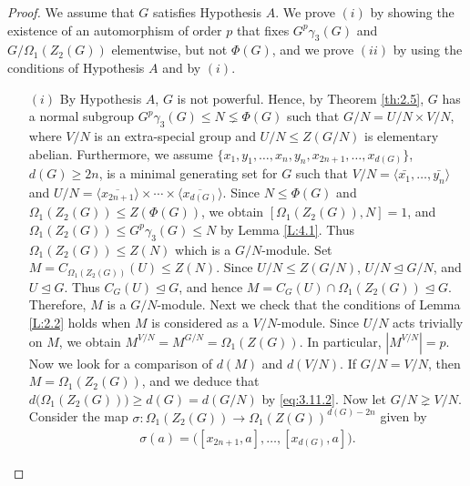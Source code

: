 \documentclass[preprint,sort&compress,12pt]{elsarticle}
\theoremstyle{definition}
\numberwithin{equation}{theorem}
\begin{document}
\begin{proof}
We assume that $G$ satisfies Hypothesis $A$. We prove $(i)$ by showing the existence of an automorphism of order $p$ that fixes $G^p\gamma_3(G)$ and $G/\Omega_1(Z_2(G))$ elementwise, but not $\Phi(G)$, and we prove $(ii)$ by using the conditions of Hypothesis $A$ and by $(i)$. 
\begin{itemize}
\item [$(i)$] By Hypothesis $A$, $G$ is not powerful. Hence, by Theorem \ref{th:2.5}, $G$ has a normal subgroup $G^p\gamma_3(G)\le N\lneq \Phi(G)$ such that $G/N=U/N\times V/N$, where $V/N$ is an extra-special group and $U/N\le Z(G/N)$ is elementary abelian. Furthermore, we assume $\{x_1, y_1, \dots, x_n, y_n, x_{2n+1}, \dots, x_{d(G)}\}$, $d(G)\ge 2n$, is a minimal generating set for $G$ such that $V/N=\langle \bar{x_1}, \dots, \bar{y_n}\rangle$ and $U/N=\langle \overline{x_{2n+1}}\rangle \times \cdots \times \langle \overline{x_{d(G)}}\rangle$. Since $N\le \Phi(G)$ and $\Omega_1(Z_2(G))\le Z(\Phi(G))$, we obtain $[\Omega_1(Z_2(G)), N]=1$, and $\Omega_1(Z_2(G))\le G^p\gamma_3(G)\le N$ by Lemma \ref{L:4.1}. Thus $\Omega_1(Z_2(G))\le Z(N)$ which is a $G/N$-module. Set $M=C_{\Omega_1(Z_2(G))}(U)\le Z(N)$. Since $U/N\le Z(G/N)$, $U/N\unlhd G/N$, and $U\unlhd G$. Thus $C_G(U)\unlhd G$, and hence $M=C_G(U)\cap \Omega_1(Z_2(G))\unlhd G$. Therefore, $M$ is a $G/N$-module. Next we check that the conditions of Lemma \ref{L:2.2} holds when $M$ is considered as a $V/N$-module. Since $U/N$ acts trivially on $M$, we obtain $M^{V/N}=M^{G/N}=\Omega_1(Z(G))$. In particular, $|M^{V/N}|=p$. Now we look for a comparison of $d(M)$ and $d(V/N)$. If $G/N=V/N$, then $M=\Omega_1(Z_2(G))$, and we deduce that $d\big(\Omega_1(Z_2(G))\big)\ge d(G)= d(G/N)$ by \eqref{eq:3.11.2}. Now let $G/N\gneq V/N$. Consider the map $\sigma:\Omega_1(Z_2(G)) \rightarrow \Omega_1(Z(G))^{d(G)-2n}$ given by
\begin{align*}
\sigma(a)=\big([x_{2n+1}, a], \ldots, [x_{d(G)}, a]\big).
\end{align*}

\end{itemize}
\end{proof}
\end{document}
